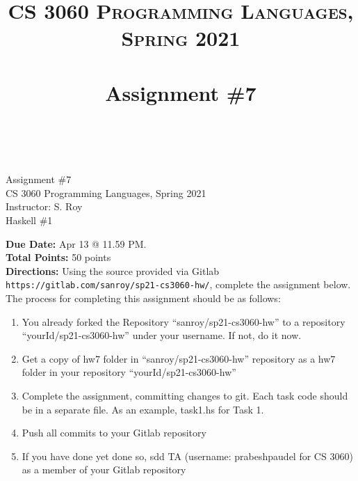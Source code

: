 \documentclass[paper=letter, fontsize=11pt]{scrartcl} %
\title{ 
    \normalfont \normalsize 
    \textsc{CS 3060 Programming Languages, Spring 2021} \\ [25pt] %
    \horrule{0.5pt} \\[0.4cm] %
    \huge Assignment \#7  \\ %
    \horrule{2pt} \\[0.5cm] %
}
\begin{document}
    \begin{center}
         Assignment \#7\\
        \small CS 3060 Programming Languages, Spring 2021 \\
        \small Instructor: S. Roy \\
        \huge Haskell \#1
    \end{center}
    
    \textbf{Due Date:} Apr 13 @ 11.59 PM. \\
    \textbf{Total Points:} 50 points \\

    \textbf{Directions:} Using the source provided via Gitlab \@ \texttt{https://gitlab.com/sanroy/sp21-cs3060-hw/},
complete the assignment below. The process for completing this assignment should be as follows:

    \begin{enumerate}[noitemsep]
        \item You already forked the Repository ``sanroy/sp21-cs3060-hw'' to a repository ``yourId/sp21-cs3060-hw'' under your username. If not, do it now.
        \item Get a copy of hw7 folder in ``sanroy/sp21-cs3060-hw'' repository as a hw7 folder in your repository ``yourId/sp21-cs3060-hw''
        \item Complete the assignment, committing changes to git. Each task code should be in a separate file. As an example, task1.hs for Task 1.
        \item Push all commits to your Gitlab repository
        \item If you have done yet done so, sdd TA (username: prabeshpaudel for CS 3060) as a member of your Gitlab repository
    \end{enumerate}
\end{document}
